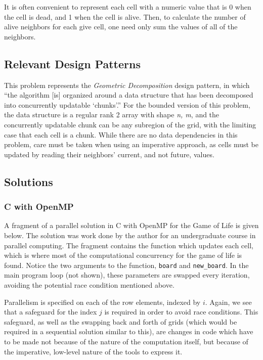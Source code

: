 It is often convenient to represent each cell with a numeric value 
that is 0 when the cell is dead, and 1 when the cell is alive. 
Then, to calculate the number of alive neighbors for each give cell, 
one need only sum the values of all of the neighbors.

\subsection{Relevant Design Patterns}
This problem represents the \textit{Geometric Decomposition} design pattern,\cite{mass}
in which ``the algorithm [is] organized around a data structure that has been decomposed into concurrently updatable `chunks'.''
For the bounded version of this problem, 
the data structure is a regular rank 2 array with shape \textit{n, m}, 
and the concurrently updatable chunk can be any subregion of the grid, 
with the limiting case that each cell is a chunk. 
While there are no data dependencies in this problem, 
care must be taken when using an imperative approach, 
as cells must be updated by reading their neighbors' current, and not future, values.

\subsection{Solutions}
\subsubsection{C with OpenMP}
A fragment of a parallel solution in C with OpenMP for the Game of Life is given below. 
The solution was work done by the author for an undergraduate course in parallel computing.
The fragment contains the function which updates each cell, 
which is where most of the computational concurrency for the game of life is found. 
Notice the two arguments to the function, \texttt{board} and \texttt{new\_board}.
In the main program loop (not shown), these parameters are swapped every iteration, 
avoiding the potential race condition mentioned above.

\begin{singlespacing}
\begin{small}

\end{small}
\end{singlespacing}

Parallelism is specified on each of the row elements, indexed by $i$.
Again, we see that a safeguard for the index $j$ is required in order to avoid race conditions. 
This safeguard, as well as the swapping back and forth of grids (which would be required in a sequential solution similar to this), 
are changes in code which have to be made not because of the nature of the computation itself, 
but because of the imperative, low-level nature of the tools to express it.

